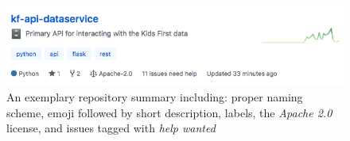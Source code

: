 \documentclass[a4paper,12pt,titlepage]{scrartcl}
\begin{document}
	\begin{figure}
    		\centering
    		\includegraphics[width=0.6\linewidth]{images/reposummary.png}
    		\caption{An exemplary repository summary including: proper naming scheme, emoji followed by short description, labels, the {\em Apache 2.0} license, and issues tagged with {\em help wanted}}
    		\label{fig:reposummary}
    \end{figure}

	
	 
\end{document}
